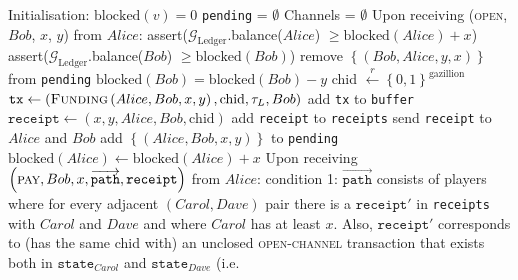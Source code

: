\begin{algorithm}
  \caption{$\mathcal{F}_{\mathrm{PayNet}}$}
  \label{alg:payfunc}
  \begin{algorithmic}[1]
    \State Initialisation:
      \Indent
        \State $\mathrm{blocked}\left(v\right) = 0$
      \EndFor
      \State \texttt{pending} = $\emptyset$
      \State Channels = $\emptyset$
      \EndIndent
    \State
    \State Upon receiving (\textsc{open}, $Bob$, $x$, $y$) from $Alice$:
    \Indent
        \State assert($\mathcal{G}_{\mathrm{Ledger}}$.balance($Alice$) $\geq
        \mathrm{blocked}\left(Alice\right) + x$)
        \State assert($\mathcal{G}_{\mathrm{Ledger}}$.balance($Bob$) $\geq
        \mathrm{blocked}\left(Bob\right)$)
        \State remove $\left\{\left(Bob, Alice, y, x\right)\right\}$ from
        \texttt{pending}
        \State $\mathrm{blocked}\left(Bob\right) = \mathrm{blocked}\left(Bob\right) - y$
        \State chid $\overset{r}{\leftarrow} \left\{0, 1\right\}^{\mathrm{gazillion}}$
        \State $\mathtt{tx} \gets \left(\textsc{Funding}\left(Alice, Bob, x, y\right),
        \mathrm{chid}, \tau_L, Bob\right)$
        \State add \texttt{tx} to \texttt{buffer}
        \State $\mathtt{receipt} \gets \left(x, y, Alice, Bob,
        \mathrm{chid}\right)$
        \State add \texttt{receipt} to \texttt{receipts}
        \State send \texttt{receipt} to $Alice$ and $Bob$
      \Else
        \State add $\left\{\left(Alice, Bob, x, y\right)\right\}$ to
        \texttt{pending}
        \State $\mathrm{blocked}\left(Alice\right) \leftarrow
        \mathrm{blocked}\left(Alice\right) + x$
      \EndIf
    \EndIndent
    \State
    \State Upon receiving $\left(\textsc{pay}, Bob, x,
    \overrightarrow{\mathtt{path}}, \mathtt{receipt}\right)$ from $Alice$:
    \Indent
      \State condition 1: $\overrightarrow{\mathtt{path}}$ consists of players
      where for every adjacent $\left(Carol, Dave\right)$ pair there is a
      $\mathtt{receipt}'$ in \texttt{receipts} with $Carol$ and $Dave$ and where
      $Carol$ has at least $x$. Also, $\mathtt{receipt}'$ corresponds to (has
      the same chid with) an unclosed \textsc{open-channel} transaction that
      exists both in $\mathtt{state}_{Carol}$ and $\mathtt{state}_{Dave}$ (i.e.

\end{algorithmic}
\end{algorithm}
